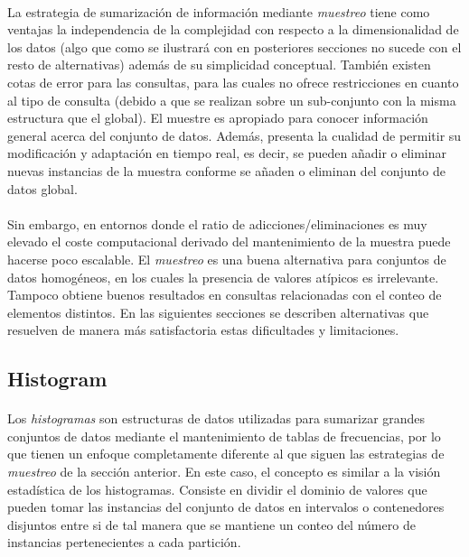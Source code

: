 \documentclass{subfiles}
\begin{document}
        \paragraph{}
        La estrategia de sumarización de información mediante \emph{muestreo} tiene como ventajas la independencia de la complejidad con respecto a la dimensionalidad de los datos (algo que como se ilustrará con en posteriores secciones no sucede con el resto de alternativas) además de su simplicidad conceptual. También existen cotas de error para las consultas, para las cuales no ofrece restricciones en cuanto al tipo de consulta (debido a que se realizan sobre un sub-conjunto con la misma estructura que el global). El muestre es apropiado para conocer información general acerca del conjunto de datos. Además, presenta la cualidad de permitir su modificación y adaptación en tiempo real, es decir, se pueden añadir o eliminar nuevas instancias de la muestra conforme se añaden o eliminan del conjunto de datos global.

        \paragraph{}
        Sin embargo, en entornos donde el ratio de adicciones/eliminaciones es muy elevado el coste computacional derivado del mantenimiento de la muestra puede hacerse poco escalable. El \emph{muestreo} es una buena alternativa para conjuntos de datos homogéneos, en los cuales la presencia de valores atípicos es irrelevante. Tampoco obtiene buenos resultados en consultas relacionadas con el conteo de elementos distintos. En las siguientes secciones se describen alternativas que resuelven de manera más satisfactoria estas dificultades y limitaciones.

      \subsection{Histogram}
      \label{sec:histogram}

        \paragraph{}
        Los \emph{histogramas} son estructuras de datos utilizadas para sumarizar grandes conjuntos de datos mediante el mantenimiento de tablas de frecuencias, por lo que tienen un enfoque completamente diferente al que siguen las estrategias de \emph{muestreo} de la sección anterior. En este caso, el concepto es similar a la visión estadística de los histogramas. Consiste en dividir el dominio de valores que pueden tomar las instancias del conjunto de datos en intervalos o contenedores disjuntos entre si de tal manera que se mantiene un conteo del número de instancias pertenecientes a cada partición.
\end{document}

